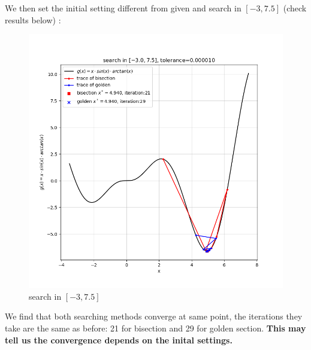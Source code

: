 \documentclass{article}
\begin{document}
We then set the initial setting different from given and search in $[-3,7.5]$ (check results below) :
\begin{figure}[th]
    \centering
    \includegraphics[scale = 0.8]{left_-3.0_right_7.5.png}
    \caption{search in $[-3,7.5]$}
\end{figure}
We find that both searching methods converge at same point, the iterations they take are the same as before: 21 for bisection and 29 for golden section. \textbf{This may tell us the convergence depends on the inital settings.}
\end{document}
